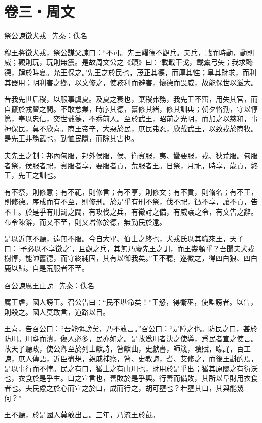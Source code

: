 \documentclass[12pt,a4paper]{ctexbook}
\begin{document}
\section{卷三・周文}
祭公諫徵犬戎·先秦：佚名 \par
穆王將徵犬戎，祭公謀父諫曰：“不可。先王耀德不觀兵。夫兵，戢而時動，動則威；觀則玩，玩則無震。是故周文公之《頌》曰：‘載戢干戈，載櫜弓矢；我求懿德，肆於時夏。允王保之。’先王之於民也，茂正其德，而厚其性；阜其財求，而利其器用；明利害之鄉，以文修之，使務利而避害，懷德而畏威，故能保世以滋大。\par
昔我先世后稷，以服事虞夏。及夏之衰也，棄稷弗務，我先王不窋，用失其官，而自竄於戎翟之間。不敢怠業，時序其德，纂修其緒，修其訓典；朝夕恪勤，守以惇篤，奉以忠信，奕世戴德，不忝前人。至於武王，昭前之光明，而加之以慈和，事神保民，莫不欣喜。商王帝辛，大惡於民，庶民弗忍，欣戴武王，以致戎於商牧。是先王非務武也，勤恤民隱，而除其害也。\par
夫先王之制：邦內甸服，邦外侯服，侯、衛賓服，夷、蠻要服，戎、狄荒服。甸服者祭，侯服者祀，賓服者享，要服者貢，荒服者王。日祭，月祀，時享，歲貢，終王，先王之訓也。\par
有不祭，則修意；有不祀，則修言；有不享，則修文；有不貢，則脩名；有不王，則修德。序成而有不至，則修刑。於是乎有刑不祭，伐不祀，徵不享，讓不貢，告不王。於是乎有刑罰之闢，有攻伐之兵，有徵討之備，有威讓之令，有文告之辭。布令陳辭，而又不至，則又增修於德，無勤民於遠。\par
是以近無不聽，遠無不服。今自大畢、伯士之終也，犬戎氏以其職來王，天子曰：‘予必以不享徵之’，且觀之兵，其無乃廢先王之訓，而王幾頓乎？吾聞夫犬戎樹惇，能帥舊德，而守終純固，其有以御我矣。”王不聽，遂徵之，得四白狼、四白鹿以歸。自是荒服者不至。\par
召公諫厲王止謗·先秦：佚名 \par
厲王虐，國人謗王。召公告曰：“民不堪命矣！”王怒，得衛巫，使監謗者。以告，則殺之。國人莫敢言，道路以目。\par
王喜，告召公曰：“吾能弭謗矣，乃不敢言。”召公曰：“是障之也。防民之口，甚於防川。川壅而潰，傷人必多，民亦如之。是故爲川者決之使導，爲民者宣之使言。故天子聽政，使公卿至於列士獻詩，瞽獻曲，史獻書，師箴，瞍賦，曚誦，百工諫，庶人傳語，近臣盡規，親戚補察，瞽、史教誨，耆、艾修之，而後王斟酌焉，是以事行而不悖。民之有口，猶土之有山川也，財用於是乎出；猶其原隰之有衍沃也，衣食於是乎生。口之宣言也，善敗於是乎興。行善而備敗，其所以阜財用衣食者也。夫民慮之於心而宣之於口，成而行之，胡可壅也？若壅其口，其與能幾何？”\par
王不聽，於是國人莫敢出言。三年，乃流王於彘。\par
\end{document}
